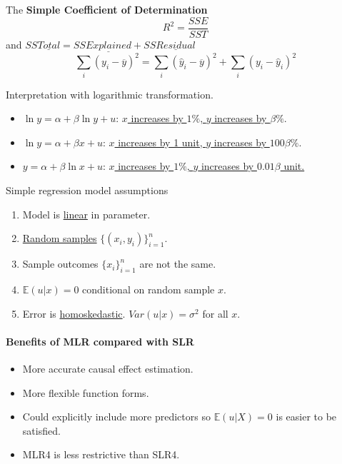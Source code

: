\documentclass[]{article}
\begin{document}
	\begin{definition}
	    The \textbf{Simple Coefficient of Determination}
	    \[
	        R^2 = \frac{SSE}{SST}
	    \]
	    and $SS\underline{Total} = SS\underline{Explained} + SS\underline{Residual}$
	    \[
	        \sum_i {(y_i - \overline{y})^2} = \sum_i {(\hat{y}_i - \overline{y})^2} + \sum_i {(y_i - \hat{y}_i)^2}
	    \]
	\end{definition}
	
	\begin{proposition}[Logarithms] Interpretation with logarithmic transformation.
	    \begin{itemize}
	        \item $\ln{y} = \alpha + \beta \ln{y} + u$: \ul{$x$ increases by $1\%$, $y$ increases by $\beta \%$}.
	        \item $\ln{y} = \alpha + \beta x + u$: \ul{$x$ increases by 1 unit, $y$ increases by $100 \beta \%$}.
	        \item $y = \alpha + \beta \ln{x} + u$: \ul{$x$ increases by $1\%$, $y$ increases by $0.01\beta$ unit.}
	    \end{itemize}
	\end{proposition}
	
	\begin{assumption}
	    Simple regression model assumptions
	    \begin{enumerate}
	        \item Model is \ul{linear} in parameter.
	        \item \ul{Random samples} $\{(x_i, y_i)\}_{i=1}^n$.
	        \item Sample outcomes $\{x_i\}_{i=1}^n$ are not the same.
	        \item $\mathbb{E}(u|x)=0$ conditional on random sample $x$.
	        \item Error is \ul{homoskedastic}. $Var(u|x) = \sigma^2$ for all $x$.
	    \end{enumerate}
	\end{assumption}
	\paragraph{Benefits of MLR compared with SLR}
	    \begin{itemize}
	        \item More accurate causal effect estimation.
	        \item More flexible function forms.
	        \item Could explicitly include more predictors so $\mathbb{E}(u|X) = 0$ is easier to be satisfied.
	        \item MLR4 is less restrictive than SLR4.
	    \end{itemize}
	   
\end{document}
